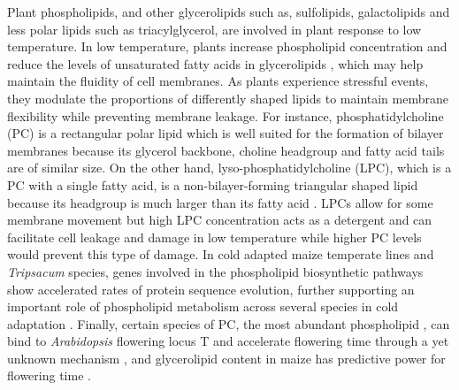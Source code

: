 \documentclass[9pt,twocolumn,twoside,lineno]{BioRxiv}
\begin{document}
Plant phospholipids, and other glycerolipids such as, sulfolipids, galactolipids and less polar lipids such as triacylglycerol, are involved in plant response to low temperature.
In low temperature, plants increase phospholipid concentration \cite{Degenkolbe2012-wf} and reduce the levels of unsaturated fatty acids in glycerolipids \cite{Welti2002-uk, Lynch1987-ln}, which may help maintain the fluidity of cell membranes.
As plants experience stressful events, they modulate the proportions of differently shaped lipids to maintain membrane flexibility while preventing membrane leakage. 
For instance, phosphatidylcholine (PC) is a rectangular polar lipid which is well suited for the formation of bilayer membranes because its glycerol backbone, choline headgroup and fatty acid tails are of similar size.
On the other hand, lyso-phosphatidylcholine (LPC), which is a PC with a single fatty acid, is a non-bilayer-forming triangular shaped lipid because its headgroup is much larger than its fatty acid \cite{Jouhet2013-fv}.
LPCs allow for some membrane movement but high LPC concentration acts as a detergent \cite{Henriksen2010-cm} and can facilitate cell leakage and damage in low temperature while higher PC levels would prevent this type of damage.
In cold adapted maize temperate lines and \textit{Tripsacum} species, genes involved in the phospholipid biosynthetic pathways show accelerated rates of protein sequence evolution, further supporting an important role of phospholipid metabolism across several species in cold adaptation \cite{Yan2019-tx}. 
Finally, certain species of PC, the most abundant phospholipid \cite{Gu2017-nd}, can bind to \textit{Arabidopsis} flowering locus T and accelerate flowering time through a yet unknown mechanism \cite{Nakamura2014-qf}, and glycerolipid content in maize has predictive power for flowering time \cite{Riedelsheimer2013-bd}. 
\end{document}
